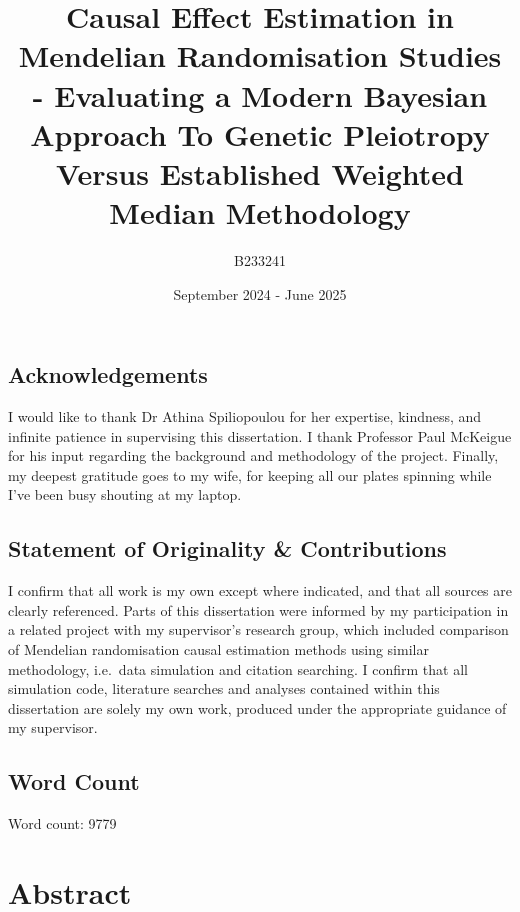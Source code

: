 \documentclass[
]{article}
\title{Causal Effect Estimation in Mendelian Randomisation Studies - Evaluating a Modern Bayesian Approach To Genetic Pleiotropy Versus Established Weighted Median Methodology}
\author{B233241}
\date{September 2024 - June 2025}
\begin{document}
\maketitle

{
\hypersetup{linkcolor=}
\setcounter{tocdepth}{2}
\tableofcontents
}
\newpage

\subsection*{Acknowledgements}\label{acknowledgements}

I would like to thank Dr Athina Spiliopoulou for her expertise, kindness, and infinite patience in supervising this dissertation. I thank Professor Paul McKeigue for his input regarding the background and methodology of the project. Finally, my deepest gratitude goes to my wife, for keeping all our plates spinning while I've been busy shouting at my laptop.

\subsection*{Statement of Originality \& Contributions}\label{statement-of-originality-contributions}

I confirm that all work is my own except where indicated, and that all sources are clearly referenced. Parts of this dissertation were informed by my participation in a related project with my supervisor's research group, which included comparison of Mendelian randomisation causal estimation methods using similar methodology, i.e.~data simulation and citation searching. I confirm that all simulation code, literature searches and analyses contained within this dissertation are solely my own work, produced under the appropriate guidance of my supervisor.

\subsection*{Word Count}\label{word-count}

Word count:
9779

\newpage

\section{Abstract}\label{abstract}
\end{document}

